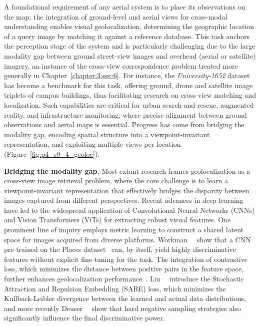 A foundational requirement of any aerial system is to place its observations on the map: the integration of ground-level and aerial views for cross-modal understanding enables visual geolocalization, determining the geographic location of a query image by matching it against a reference database. This task anchors the perception stage of the system and is particularly challenging due to the large modality gap between ground street-view images and overhead (aerial or satellite) imagery, an instance of the cross-view correspondence problem treated more generally in Chapter~\ref{chapter:3:sec:6}.
For instance, the \textit{University-1652} dataset~\cite{zheng2020university} has become a benchmark for this task, offering ground, drone and satellite image triplets of campus buildings, thus facilitating research on cross-view matching and localization. Such capabilities are critical for urban search-and-rescue, augmented reality, and infrastructure monitoring, where precise alignment between ground observations and aerial maps is essential.
Progress has come from bridging the modality gap, encoding spatial structure into a viewpoint-invariant representation, and exploiting multiple views per location (Figure~\ref{fig:p4_s9_4_geoloc}).



\textbf{Bridging the modality gap.} Most extant research frames geolocalization as a cross-view image retrieval problem, where the core challenge is to learn a viewpoint-invariant representation that effectively bridges the disparity between images captured from different perspectives. Recent advances in deep learning have led to the widespread application of Convolutional Neural Networks (CNNs) and Vision Transformers (ViTs) for extracting robust visual features. One prominent line of inquiry employs metric learning to construct a shared latent space for images acquired from diverse platforms. Workman~\etal~\cite{workman2015location} show that a CNN pre-trained on the Places dataset~\cite{zhou2014learning} can, by itself, yield highly discriminative features without explicit fine-tuning for the task. The integration of contrastive loss, which minimizes the distance between positive pairs in the feature space, further enhances geolocalization performance~\cite{workman2015wide,lin2015learning}. Liu~\etal~\cite{liu2019stochastic} introduce the Stochastic Attraction and Repulsion Embedding (SARE) loss, which minimizes the Kullback-Leibler divergence between the learned and actual data distributions, and more recently Deuser~\etal~\cite{deuser2023sample4geo} show that hard negative sampling strategies also significantly influence the final discriminative power.


